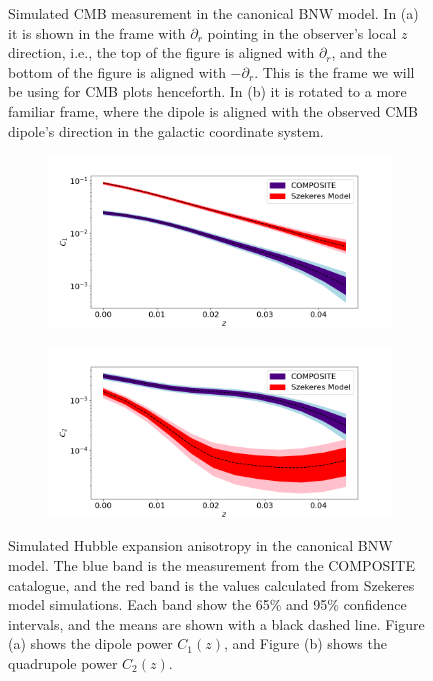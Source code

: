 \documentclass[a4paper,12pt]{report}
\begin{document}
\begin{figure}
\begin{subfigure}{0.45\textwidth}
        \caption{}
    \end{subfigure}
    \caption{Simulated CMB measurement in the canonical BNW model. In (a) it is shown in the frame with $\partial_r$ pointing in the observer's local $z$ direction, i.e., the top of the figure is aligned with $\partial_r$, and the bottom of the figure is aligned with $-\partial_r$. This is the frame we will be using for CMB plots henceforth. In (b) it is rotated to a more familiar frame, where the dipole is aligned with the observed CMB dipole's direction in the galactic coordinate system.}
    \label{fig: canonical BNW CMB}
\end{figure}

\begin{figure}
     \centering
     \begin{subfigure}[b]{105mm}
         \centering
         \includegraphics[width=\textwidth]{canonical BNW recomputes/Hub C1.png}
         \caption{}
     \end{subfigure}
     \hfill
     \begin{subfigure}[b]{105mm}
         \centering
         \includegraphics[width=\textwidth]{canonical BNW recomputes/Hub C2.png}
         \caption{}
     \end{subfigure}
      \caption{Simulated Hubble expansion anisotropy in the canonical BNW model. The blue band is the measurement from the COMPOSITE catalogue, and the red band is the values calculated from Szekeres model simulations. Each band show the 65\% and 95\% confidence intervals, and the means are shown with a black dashed line. Figure (a) shows the dipole power $C_1(z)$, and Figure (b) shows the quadrupole power $C_2(z)$.}
      \label{fig: canonical BNW Hubble expansion anisotropy}
\end{figure}
\end{document}
